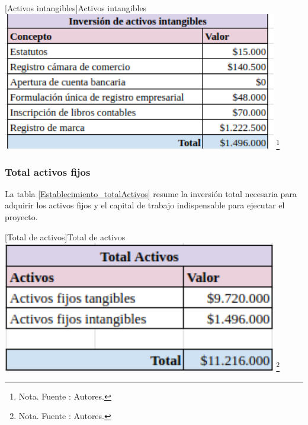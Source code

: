 \vspace{2mm}
        \begin{minipage}{0.9\textwidth}
        \centering
        [{Activos intangibles}]{Activos intangibles}
        \label{Establecimiento_intangibles}
        \includegraphics[width=0.9\textwidth]{Content/Images/AF/Establecimiento_intangibles.png}
        \footnote{Nota. \textup{Fuente : Autores.}}
        \end{minipage}

\subsubsection{Total activos fijos}
La tabla \ref{Establecimiento_totalActivos} resume la inversión total necesaria para adquirir los activos fijos y el capital de trabajo indispensable para ejecutar el proyecto.

\vspace{2mm}
        \begin{minipage}{0.9\textwidth}
        \centering
        [{Total de activos}]{Total de activos}
        \label{Establecimiento_totalActivos}
        \includegraphics[width=0.9\textwidth]{Content/Images/AF/Establecimiento_totalActivos.png}
        \footnote{Nota. \textup{Fuente : Autores.}}
        \end{minipage}

